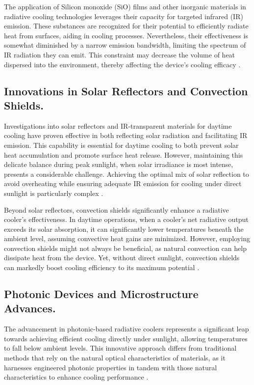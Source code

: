 The application of Silicon monoxide (SiO) films and other inorganic materials in radiative cooling technologies leverages their capacity for targeted infrared (IR) emission. These substances are recognized for their potential to efficiently radiate heat from surfaces, aiding in cooling processes. Nevertheless, their effectiveness is somewhat diminished by a narrow emission bandwidth, limiting the spectrum of IR radiation they can emit. This constraint may decrease the volume of heat dispersed into the environment, thereby affecting the device's cooling efficacy \cite{hossain_radiative_2016}.

\subsection{Innovations in Solar Reflectors and Convection Shields.}
Investigations into solar reflectors and IR-transparent materials for daytime cooling have proven effective in both reflecting solar radiation and facilitating IR emission. This capability is essential for daytime cooling to both prevent solar heat accumulation and promote surface heat release. However, maintaining this delicate balance during peak sunlight, when solar irradiance is most intense, presents a considerable challenge. Achieving the optimal mix of solar reflection to avoid overheating while ensuring adequate IR emission for cooling under direct sunlight is particularly complex \cite{hossain_radiative_2016}.

Beyond solar reflectors, convection shields significantly enhance a radiative cooler's effectiveness. In daytime operations, when a cooler's net radiative output exceeds its solar absorption, it can significantly lower temperatures beneath the ambient level, assuming convective heat gains are minimized. However, employing convection shields might not always be beneficial, as natural convection can help dissipate heat from the device. Yet, without direct sunlight, convection shields can markedly boost cooling efficiency to its maximum potential \cite{hossain_radiative_2016}.

\subsection{Photonic Devices and Microstructure Advances.}
The advancement in photonic-based radiative coolers represents a significant leap towards achieving efficient cooling directly under sunlight, allowing temperatures to fall below ambient levels. This innovative approach differs from traditional methods that rely on the natural optical characteristics of materials, as it harnesses engineered photonic properties in tandem with those natural characteristics to enhance cooling performance \cite{hossain_radiative_2016}.

